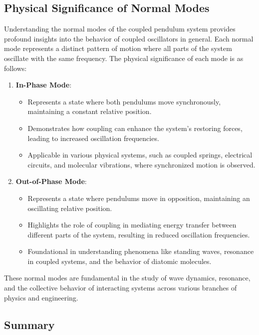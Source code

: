 \documentclass[12pt]{report} %
\begin{document}
\subsection{Physical Significance of Normal Modes}
\label{subsec:part1_task5_physical_significance}

Understanding the normal modes of the coupled pendulum system provides profound insights into the behavior of coupled oscillators in general. Each normal mode represents a distinct pattern of motion where all parts of the system oscillate with the same frequency. The physical significance of each mode is as follows:

\begin{enumerate}
    \item \textbf{In-Phase Mode}:
    \begin{itemize}
        \item Represents a state where both pendulums move synchronously, maintaining a constant relative position.
        \item Demonstrates how coupling can enhance the system's restoring forces, leading to increased oscillation frequencies.
        \item Applicable in various physical systems, such as coupled springs, electrical circuits, and molecular vibrations, where synchronized motion is observed.
    \end{itemize}
    
    \item \textbf{Out-of-Phase Mode}:
    \begin{itemize}
        \item Represents a state where pendulums move in opposition, maintaining an oscillating relative position.
        \item Highlights the role of coupling in mediating energy transfer between different parts of the system, resulting in reduced oscillation frequencies.
        \item Foundational in understanding phenomena like standing waves, resonance in coupled systems, and the behavior of diatomic molecules.
    \end{itemize}
\end{enumerate}

These normal modes are fundamental in the study of wave dynamics, resonance, and the collective behavior of interacting systems across various branches of physics and engineering.

\subsection{Summary}
\label{subsec:part1_task5_summary}
\end{document}
